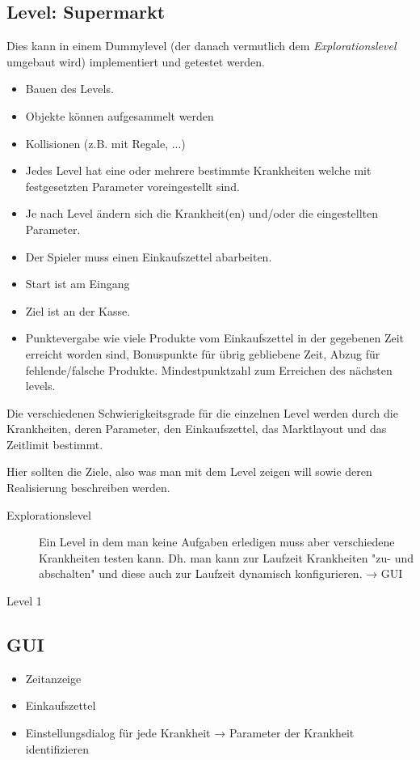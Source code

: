 \documentclass[a4paper, 11pt]{scrartcl}
\begin{document}
\subsection{Level: Supermarkt}
Dies kann in einem Dummylevel (der danach vermutlich dem
\emph{Explorationslevel} umgebaut wird) implementiert und getestet werden.
\begin{itemize}
    \item Bauen des Levels.
    \item Objekte können aufgesammelt werden
    \item Kollisionen (z.B. mit Regale, ...)
    \item Jedes Level hat eine oder mehrere bestimmte Krankheiten welche mit festgesetzten Parameter voreingestellt sind.
    \item Je nach Level ändern sich die Krankheit(en) und/oder die eingestellten Parameter.
    \item Der Spieler muss einen Einkaufszettel abarbeiten.
    \item Start ist am Eingang
    \item Ziel ist an der Kasse.
    \item Punktevergabe wie viele Produkte vom Einkaufszettel in der gegebenen Zeit erreicht worden sind, Bonuspunkte für übrig gebliebene Zeit, Abzug für fehlende/falsche Produkte. Mindestpunktzahl zum Erreichen des nächsten levels.
\end{itemize}
Die verschiedenen Schwierigkeitsgrade für die einzelnen Level werden durch die Krankheiten, deren Parameter, den Einkaufszettel, das Marktlayout und das Zeitlimit bestimmt.


Hier sollten die Ziele, also was man mit dem Level zeigen will sowie deren Realisierung beschreiben werden.
\begin{description}
    \item[Explorationslevel]
    Ein Level in dem man keine Aufgaben erledigen muss aber verschiedene Krankheiten testen kann.
    Dh. man kann zur Laufzeit Krankheiten "zu- und abschalten" und diese auch zur Laufzeit dynamisch konfigurieren. → GUI
    \item[Level 1]
\end{description}


\subsection{GUI}
\begin{itemize}
    \item Zeitanzeige
    \item Einkaufszettel
    \item Einstellungsdialog für jede Krankheit → Parameter der Krankheit identifizieren
\end{itemize}
\end{document}
